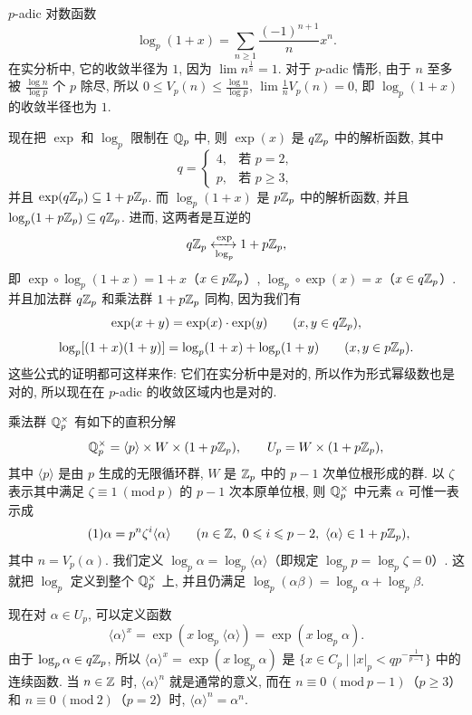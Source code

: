 \begin{example}
$p$-adic 对数函数
\[
  \log_p(1+x)=\sum_{n\geqslant 1}\frac{(-1)^{n+1}}{n}x^n.
\]
在实分析中, 它的收敛半径为 $1$, 因为 $\lim n^{\frac{1}{n}}=1$. 对于 $p$-adic 情形, 由于 $n$ 至多被 $\frac{\log n}{\log p}$ 个 $p$ 除尽, 所以 $0\leqslant V_p(n)\leqslant\frac{\log n}{\log p}$, $\lim\frac{1}{n}V_p(n)=0$, 即 $\log_p(1+x)$ 的收敛半径也为 $1$.
\end{example}

现在把 $\exp$ 和 $\log_p$ 限制在 $\mathbb{Q}_p$ 中, 则 $\exp(x)$ 是 $q\mathbb{Z}_p$ 中的解析函数, 其中
\[
  q=\begin{cases}
    4, & \text{若 } p=2,\\
    p, & \text{若 } p\geqslant 3,
  \end{cases}
\]
并且 $\exp(q\mathbb{Z}_p)\subseteq 1+p\mathbb{Z}_p$. 而 $\log_p(1+x)$ 是 $p\mathbb{Z}_p$ 中的解析函数, 并且 $\log_p(1+p\mathbb{Z}_p)\subseteq q\mathbb{Z}_p$. 进而, 这两者是互逆的
\[
  q\mathbb{Z}_p\xleftrightarrow[\log_p]{\exp}1+p\mathbb{Z}_p,
\]
即 $\exp\circ\log_p(1+x)=1+x$（$x\in p\mathbb{Z}_p$）, $\log_p\circ\exp(x)=x$（$x\in q\mathbb{Z}_p$）. 并且加法群 $q\mathbb{Z}_p$ 和乘法群 $1+p\mathbb{Z}_p$ 同构, 因为我们有
\[
  \exp(x+y)=\exp(x)\cdot\exp(y)\qquad(x,y\in q\mathbb{Z}_p),
\]
\[
  \log_p[(1+x)(1+y)]=\log_p(1+x)+\log_p(1+y)\qquad(x,y\in p\mathbb{Z}_p).
\]
这些公式的证明都可这样来作: 它们在实分析中是对的, 所以作为形式幂级数也是对的, 所以现在在 $p$-adic 的收敛区域内也是对的.

乘法群 $\mathbb{Q}_p^{\times}$ 有如下的直积分解
\[
  \mathbb{Q}_p^{\times}=\langle p\rangle\times W\times(1+p\mathbb{Z}_p),\qquad
  U_p=W\times(1+p\mathbb{Z}_p),
\]
其中 $\langle p\rangle$ 是由 $p$ 生成的无限循环群, $W$ 是 $\mathbb{Z}_p$ 中的 $p-1$ 次单位根形成的群. 以 $\zeta$ 表示其中满足 $\zeta\equiv 1\ (\mathrm{mod}\ p)$ 的 $p-1$ 次本原单位根, 则 $\mathbb{Q}_p^{\times}$ 中元素 $\alpha$ 可惟一表示成
\begin{equation}\tag{1}
  \alpha=p^n\zeta^i\langle\alpha\rangle
  \qquad(n\in\mathbb{Z},\ 0\leqslant i\leqslant p-2,\ \langle\alpha\rangle\in 1+p\mathbb{Z}_p),
\end{equation}
其中 $n=V_p(\alpha)$. 我们定义 $\log_p\alpha=\log_p\langle\alpha\rangle$（即规定 $\log_p p=\log_p\zeta=0$）. 这就把 $\log_p$ 定义到整个 $\mathbb{Q}_p^{\times}$ 上, 并且仍满足 $\log_p(\alpha\beta)=\log_p\alpha+\log_p\beta$.

现在对 $\alpha\in U_p$, 可以定义函数
\[
  \langle\alpha\rangle^x=\exp(x\log_p\langle\alpha\rangle)=\exp(x\log_p\alpha).
\]
由于 $\log_p\alpha\in q\mathbb{Z}_p$, 所以 $\langle\alpha\rangle^x=\exp(x\log_p\alpha)$ 是 $\{x\in C_p\mid|x|_p<qp^{-\frac{1}{p-1}}\}$ 中的连续函数. 当 $n\in\mathbb{Z}$ 时, $\langle\alpha\rangle^n$ 就是通常的意义, 而在 $n\equiv 0\ (\mathrm{mod}\ p-1)$（$p\geqslant 3$）和 $n\equiv 0\ (\mathrm{mod}\ 2)$（$p=2$）时, $\langle\alpha\rangle^n=\alpha^n$.


